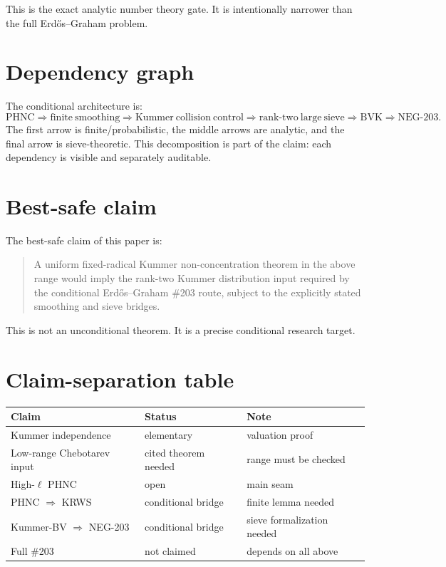 \documentclass[11pt]{article}
\newcommand{\1}{\mathbf 1}
\begin{document}
This is the exact analytic number theory gate.  It is intentionally narrower than the full Erd\H{o}s--Graham problem.


\section{Dependency graph}

The conditional architecture is:
\[
\mathrm{PHNC}
\Rightarrow
\mathrm{finite\ smoothing}
\Rightarrow
\mathrm{Kummer\ collision\ control}
\Rightarrow
\mathrm{rank\text{-}two\ large\ sieve}
\Rightarrow
\mathrm{BVK}
\Rightarrow
\mathrm{NEG\text{-}203}.
\]
The first arrow is finite/probabilistic, the middle arrows are analytic, and the final arrow is sieve-theoretic. This decomposition is part of the claim: each dependency is visible and separately auditable.

\section{Best-safe claim}

The best-safe claim of this paper is:

\begin{quote}
A uniform fixed-radical Kummer non-concentration theorem in the above range would imply the rank-two Kummer distribution input required by the conditional Erd\H{o}s--Graham \#203 route, subject to the explicitly stated smoothing and sieve bridges.
\end{quote}

This is not an unconditional theorem.  It is a precise conditional research target.


\section{Claim-separation table}

\begin{center}
\begin{tabular}{lll}
Claim & Status & Note\\
\hline
Kummer independence & elementary & valuation proof\\
Low-range Chebotarev input & cited theorem needed & range must be checked\\
High-\(\ell\) PHNC & open & main seam\\
PHNC \(\Rightarrow\) KRWS & conditional bridge & finite lemma needed\\
Kummer-BV \(\Rightarrow\) NEG-203 & conditional bridge & sieve formalization needed\\
Full \#203 & not claimed & depends on all above\\
\end{tabular}
\end{center}
\end{document}

